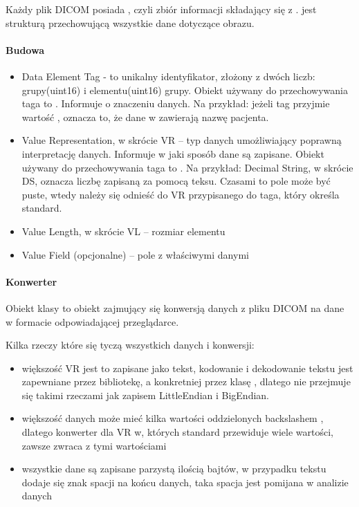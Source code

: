
Każdy plik DICOM posiada , czyli zbiór informacji składający się z .
 jest strukturą przechowującą wszystkie dane dotyczące obrazu.

\paragraph{Budowa }

\begin{itemize}
    \item Data Element Tag - to unikalny identyfikator, złożony z dwóch liczb: grupy(uint16) i elementu(uint16) grupy.
    Obiekt używany do przechowywania taga to .
    Informuje o znaczeniu danych.
    Na przykład: jeżeli tag przyjmie wartość , oznacza to, że dane w  zawierają nazwę pacjenta.
    \item Value Representation, w skrócie VR – typ danych umożliwiający poprawną interpretację danych.
    Informuje w jaki sposób dane są zapisane.
    Obiekt używany do przechowywania taga to .
    Na przykład: Decimal String, w skrócie DS, oznacza liczbę zapisaną za pomocą teksu.
    Czasami to pole może być puste, wtedy należy się odnieść do VR przypisanego do taga, który określa standard.
    \item Value Length, w skrócie VL – rozmiar elementu
    \item Value Field (opcjonalne) – pole z właściwymi danymi
\end{itemize}

\paragraph{Konwerter}

Obiekt klasy  to obiekt zajmujący się konwersją danych z pliku DICOM na dane w formacie odpowiadającej przeglądarce.

Kilka rzeczy które się tyczą wszystkich danych i konwersji:
\begin{itemize}
    \item większość VR jest to zapisane jako tekst, kodowanie i dekodowanie tekstu jest zapewniane przez bibliotekę, a konkretniej przez klasę , dlatego nie przejmuje się takimi rzeczami jak zapisem LittleEndian i BigEndian.
    \item większość danych może mieć kilka wartości oddzielonych backslashem \quotett{\textbackslash}, dlatego konwerter dla VR w, których standard przewiduje wiele wartości, zawsze zwraca  z tymi wartościami
    \item wszystkie dane są zapisane parzystą ilością bajtów, w przypadku tekstu dodaje się znak spacji na końcu danych, taka spacja jest pomijana w analizie danych
\end{itemize}

